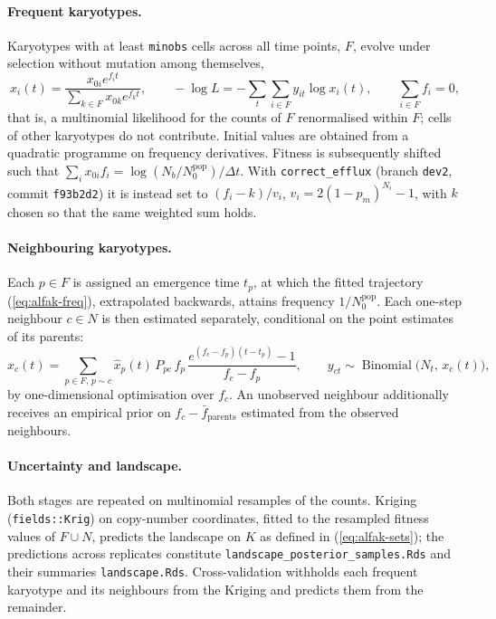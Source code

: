 \documentclass[11pt]{article}
\begin{document}
\paragraph{Frequent karyotypes.}
Karyotypes with at least \texttt{minobs} cells across all time points, $F$, evolve
under selection without mutation among themselves,
\begin{equation}
  x_i(t)=\frac{x_{0i}e^{f_it}}{\sum_{k\in F}x_{0k}e^{f_kt}},\qquad
  -\log L=-\sum_t\sum_{i\in F}y_{it}\log x_i(t),\qquad \sum_{i\in F}f_i=0,
  \label{eq:alfak-freq}
\end{equation}
that is, a multinomial likelihood for the counts of $F$ renormalised within
$F$; cells of other karyotypes do not contribute. Initial values are obtained
from a quadratic programme on frequency derivatives. Fitness is subsequently
shifted such that $\sum_ix_{0i}f_i=\log(N_b/N_0^{\mathrm{pop}})/\Delta t$. With
\texttt{correct\_efflux} (branch \texttt{dev2}, commit \texttt{f93b2d2}) it is
instead set to $(f_i-k)/v_i$, $v_i=2(1-p_m)^{N_i}-1$, with $k$ chosen so that
the same weighted sum holds.

\paragraph{Neighbouring karyotypes.}
Each $p\in F$ is assigned an emergence time $t_p$, at which the fitted
trajectory (\ref{eq:alfak-freq}), extrapolated backwards, attains frequency
$1/N_0^{\mathrm{pop}}$. Each one-step neighbour $c\in N$ is then estimated
separately, conditional on the point estimates of its parents:
\begin{equation}
  x_c(t)=\sum_{p\in F,\,p\sim c}\hat x_p(t)\,P_{pc}\,f_p\,
  \frac{e^{(f_c-f_p)(t-t_p)}-1}{f_c-f_p},
  \qquad
  y_{ct}\sim\operatorname{Binomial}\bigl(N_t,\,x_c(t)\bigr),
  \label{eq:alfak-nn}
\end{equation}
by one-dimensional optimisation over $f_c$. An unobserved neighbour
additionally receives an empirical prior on $f_c-\bar f_{\mathrm{parents}}$
estimated from the observed neighbours.

\paragraph{Uncertainty and landscape.}
Both stages are repeated on multinomial resamples of the counts. Kriging
(\texttt{fields::Krig}) on copy-number coordinates, fitted to the resampled
fitness values of $F\cup N$, predicts the landscape on $K$ as defined in
(\ref{eq:alfak-sets}); the predictions across replicates constitute
\texttt{landscape\_posterior\_samples.Rds} and their summaries
\texttt{landscape.Rds}. Cross-validation withholds each frequent karyotype and
its neighbours from the Kriging and predicts them from the remainder.
\end{document}
